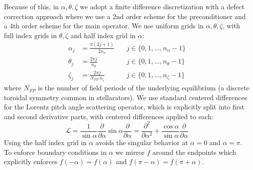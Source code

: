 \documentclass[11pt]{article}
\begin{document}
Because of this, in $\alpha, \theta, \zeta$ we adopt a finite difference
discretization with a defect correction approach where we use a 2nd order
scheme for the preconditioner and a 4th order scheme for the main operator. We
use uniform grids in $\alpha, \theta, \zeta$, with full index grids in
$\theta,\zeta$ and half index grid in $\alpha$:
\begin{align}
\alpha_j &= \frac{\pi(2j+1)}{2 n_\alpha} \quad &j \in \{0, 1, \dots, n_\alpha - 1\} \\
\theta_j &= \frac{2\pi j}{n_\theta} \quad &j \in \{0, 1, \dots, n_\theta-1\} \\
\zeta_j &= \frac{2\pi j}{N_{FP}~n_\zeta} \quad &j \in \{0, 1, \dots, n_\zeta-1\}
\end{align}
where $N_{FP}$ is the number of field periods of the underlying equilibrium (a
discrete toroidal symmetry common in stellarators). We use standard centered
differences for the Lorentz pitch angle scattering operator, which is
explicitly split into first and second derivative
parts, with centered differences applied to each:
\begin{equation}
\mathcal{L} = \frac{1}{\sin \alpha} \frac{\partial}{\partial \alpha}
\sin \alpha \frac{\partial}{\partial \alpha}
= \frac{\partial^2}{\partial \alpha^2}
+ \frac{\cos \alpha}{\sin \alpha} \frac{\partial}{\partial \alpha}
\end{equation}
Using the half index grid in $\alpha$ avoids the singular behavior at
$\alpha=0$ and $\alpha=\pi$. To enforce boundary conditions in $\alpha$ we
mirror $f$ around the endpoints which explicitly enforces
$f(-\alpha) = f(\alpha)$ and $f(\pi - \alpha) = f(\pi + \alpha)$.
\end{document}
